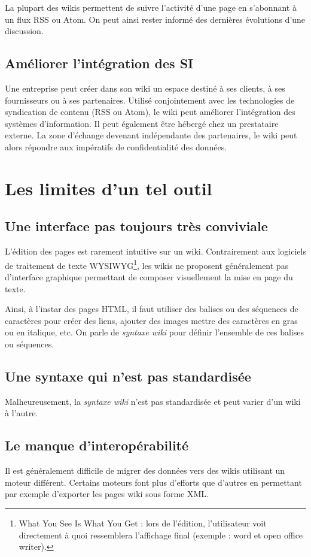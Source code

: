 \documentclass[pdftex,a4paper,11pt]{article}
\begin{document}
La plupart des wikis permettent de suivre l'activité d'une page en s'abonnant à un flux RSS ou Atom. On peut ainsi rester informé des dernières évolutions d'une discussion.

\subsection{Améliorer l'intégration des SI}
Une entreprise peut créer dans son wiki un espace destiné à ses clients, à ses fournisseurs ou à ses partenaires. Utilisé conjointement avec les technologies de syndication de contenu (RSS ou Atom), le wiki peut améliorer l'intégration des systèmes d'information. Il peut également être hébergé chez un prestataire externe. La zone d'échange devenant indépendante des partenaires, le wiki peut alors répondre aux impératifs de confidentialité des données.


\section{Les limites d'un tel outil}
\subsection{Une interface pas toujours très conviviale}
L'édition des pages est rarement intuitive sur un wiki. Contrairement aux logiciels de traitement de texte WYSIWYG\footnote{What You See Is What You Get : lors de l'édition, l'utilisateur voit directement à quoi ressemblera l'affichage final (exemple : word et open office writer).}, les wikis ne proposent généralement pas d'interface graphique permettant de composer visuellement la mise en page du texte.

Ainsi, à l'instar des pages HTML, il faut utiliser des balises ou des séquences de caractères pour créer des liens, ajouter des images mettre des caractères en gras ou en italique, etc. On parle de \emph{syntaxe wiki} pour définir l'ensemble de ces balises ou séquences.

\subsection{Une syntaxe qui n'est pas standardisée}
Malheureusement, la \emph{syntaxe wiki} n'est pas standardisée et peut varier d'un wiki à l'autre.

\subsection{Le manque d'interopérabilité}
Il est généralement difficile de migrer des données vers des wikis utilisant un moteur différent. Certains moteurs font plus d'efforts que d'autres en permettant  par exemple d'exporter les pages wiki sous forme XML.
\end{document}
